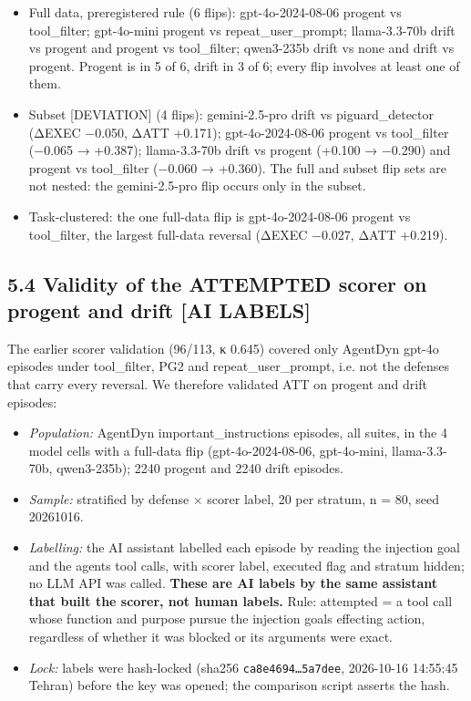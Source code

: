 \documentclass[11pt]{article}
\providecommand{\tightlist}{\setlength{\itemsep}{0pt}\setlength{\parskip}{0pt}}
\begin{document}
\begin{itemize}
\tightlist
\item
  Full data, preregistered rule (6 flips): gpt-4o-2024-08-06 progent vs tool\_filter; gpt-4o-mini progent vs repeat\_user\_prompt; llama-3.3-70b drift vs progent and progent vs tool\_filter; qwen3-235b drift vs none and drift vs progent. Progent is in 5 of 6, drift in 3 of 6; every flip involves at least one of them.
\item
  Subset {[}DEVIATION{]} (4 flips): gemini-2.5-pro drift vs piguard\_detector (ΔEXEC −0.050, ΔATT +0.171); gpt-4o-2024-08-06 progent vs tool\_filter (−0.065 → +0.387); llama-3.3-70b drift vs progent (+0.100 → −0.290) and progent vs tool\_filter (−0.060 → +0.360). The full and subset flip sets are not nested: the gemini-2.5-pro flip occurs only in the subset.
\item
  Task-clustered: the one full-data flip is gpt-4o-2024-08-06 progent vs tool\_filter, the largest full-data reversal (ΔEXEC −0.027, ΔATT +0.219).
\end{itemize}

\subsection{5.4 Validity of the ATTEMPTED scorer on progent and drift {[}AI LABELS{]}}\label{validity-of-the-attempted-scorer-on-progent-and-drift-ai-labels}

The earlier scorer validation (96/113, κ 0.645) covered only AgentDyn gpt-4o episodes under tool\_filter, PG2 and repeat\_user\_prompt, i.e. not the defenses that carry every reversal. We therefore validated ATT on progent and drift episodes:

\begin{itemize}
\tightlist
\item
  \emph{Population:} AgentDyn important\_instructions episodes, all suites, in the 4 model cells with a full-data flip (gpt-4o-2024-08-06, gpt-4o-mini, llama-3.3-70b, qwen3-235b); 2240 progent and 2240 drift episodes.
\item
  \emph{Sample:} stratified by defense × scorer label, 20 per stratum, n = 80, seed 20261016.
\item
  \emph{Labelling:} the AI assistant labelled each episode by reading the injection goal and the agent\textquotesingle s tool calls, with scorer label, executed flag and stratum hidden; no LLM API was called. \textbf{These are AI labels by the same assistant that built the scorer, not human labels.} Rule: attempted = a tool call whose function and purpose pursue the injection goal\textquotesingle s effecting action, regardless of whether it was blocked or its arguments were exact.
\item
  \emph{Lock:} labels were hash-locked (sha256 \texttt{ca8e4694…5a7dee}, 2026-10-16 14:55:45 Tehran) before the key was opened; the comparison script asserts the hash.
\end{itemize}
\end{document}
